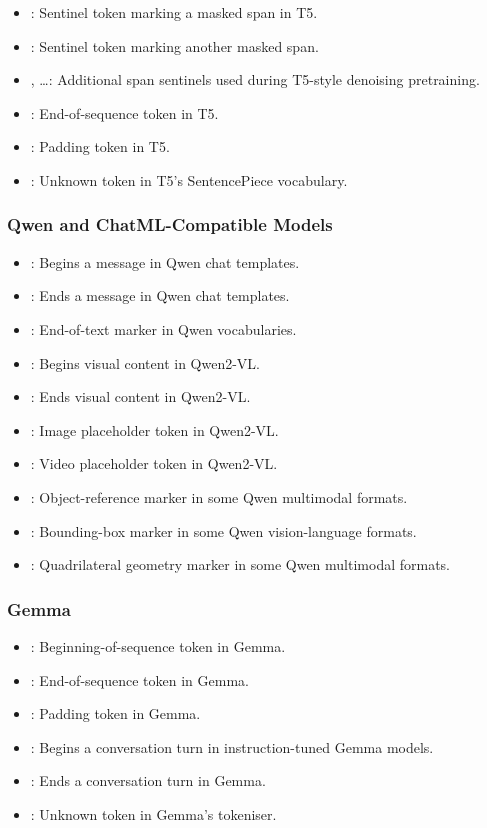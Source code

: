 \begin{itemize}
    \item {}: Sentinel token marking a masked span in T5.
    \item {}: Sentinel token marking another masked span.
    \item {}, \ldots: Additional span sentinels used during T5-style denoising pretraining.
    \item {}: End-of-sequence token in T5.
    \item {}: Padding token in T5.
    \item {}: Unknown token in T5's SentencePiece vocabulary.
\end{itemize}

\subsubsection{Qwen and ChatML-Compatible Models}

\begin{itemize}
    \item {}: Begins a message in Qwen chat templates.
    \item {}: Ends a message in Qwen chat templates.
    \item {}: End-of-text marker in Qwen vocabularies.
    \item {}: Begins visual content in Qwen2-VL.
    \item {}: Ends visual content in Qwen2-VL.
    \item {}: Image placeholder token in Qwen2-VL.
    \item {}: Video placeholder token in Qwen2-VL.
    \item {}: Object-reference marker in some Qwen multimodal formats.
    \item {}: Bounding-box marker in some Qwen vision-language formats.
    \item {}: Quadrilateral geometry marker in some Qwen multimodal formats.
\end{itemize}

\subsubsection{Gemma}

\begin{itemize}
    \item {}: Beginning-of-sequence token in Gemma.
    \item {}: End-of-sequence token in Gemma.
    \item {}: Padding token in Gemma.
    \item {}: Begins a conversation turn in instruction-tuned Gemma models.
    \item {}: Ends a conversation turn in Gemma.
    \item {}: Unknown token in Gemma's tokeniser.
\end{itemize}

